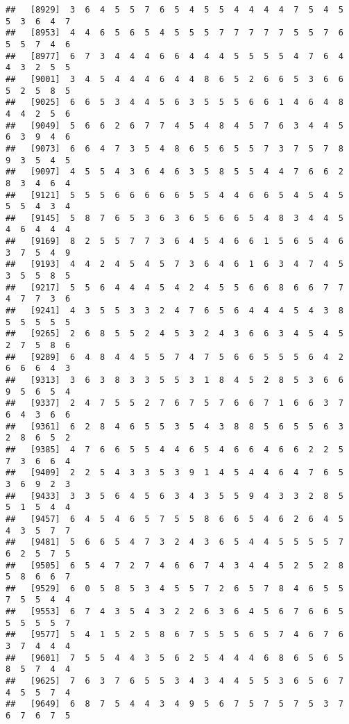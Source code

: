 \documentclass[
]{book}
\begin{document}
\begin{verbatim}
##   [8929]  3  6  4  5  5  7  6  5  4  5  5  4  4  4  4  7  5  4  5  5  3  6  4  7
##   [8953]  4  4  6  5  6  5  4  5  5  5  7  7  7  7  7  5  5  7  6  5  5  7  4  6
##   [8977]  6  7  3  4  4  4  6  6  4  4  4  5  5  5  5  4  7  6  4  4  3  2  5  5
##   [9001]  3  4  5  4  4  4  6  4  4  8  6  5  2  6  6  5  3  6  6  5  2  5  8  5
##   [9025]  6  6  5  3  4  4  5  6  3  5  5  5  6  6  1  4  6  4  8  4  4  2  5  6
##   [9049]  5  6  6  2  6  7  7  4  5  4  8  4  5  7  6  3  4  4  5  6  3  9  4  6
##   [9073]  6  6  4  7  3  5  4  8  6  5  6  5  5  7  3  7  5  7  8  9  3  5  4  5
##   [9097]  4  5  5  4  3  6  4  6  3  5  8  5  5  4  4  7  6  6  2  8  3  4  6  4
##   [9121]  5  5  5  6  6  6  6  6  5  5  4  4  6  6  5  4  5  4  5  5  5  4  3  4
##   [9145]  5  8  7  6  5  3  6  3  6  5  6  6  5  4  8  3  4  4  5  4  6  4  4  4
##   [9169]  8  2  5  5  7  7  3  6  4  5  4  6  6  1  5  6  5  4  6  3  7  5  4  9
##   [9193]  4  4  2  4  5  4  5  7  3  6  4  6  1  6  3  4  7  4  5  3  5  5  8  5
##   [9217]  5  5  6  4  4  4  5  4  2  4  5  5  6  6  8  6  6  7  7  4  7  7  3  6
##   [9241]  4  3  5  5  3  3  2  4  7  6  5  6  4  4  4  5  4  3  8  5  5  5  5  5
##   [9265]  2  6  8  5  5  2  4  5  3  2  4  3  6  6  3  4  5  4  5  2  7  5  8  6
##   [9289]  6  4  8  4  4  5  5  7  4  7  5  6  6  5  5  5  6  4  2  6  6  6  4  3
##   [9313]  3  6  3  8  3  3  5  5  3  1  8  4  5  2  8  5  3  6  6  9  5  6  5  4
##   [9337]  2  4  7  5  5  2  7  6  7  5  7  6  6  7  1  6  6  3  7  6  4  3  6  6
##   [9361]  6  2  8  4  6  5  5  3  5  4  3  8  8  5  6  5  5  6  3  2  8  6  5  2
##   [9385]  4  7  6  6  5  5  4  4  6  5  4  6  6  4  6  6  2  2  5  7  3  6  6  4
##   [9409]  2  2  5  4  3  3  5  3  9  1  4  5  4  4  6  4  7  6  5  3  6  9  2  3
##   [9433]  3  3  5  6  4  5  6  3  4  3  5  5  9  4  3  3  2  8  5  5  1  5  4  4
##   [9457]  6  4  5  4  6  5  7  5  5  8  6  6  5  4  6  2  6  4  5  4  3  5  7  7
##   [9481]  5  6  6  5  4  7  3  2  4  3  6  5  4  4  5  5  5  5  7  6  2  5  7  5
##   [9505]  6  5  4  7  2  7  4  6  6  7  4  3  4  4  5  2  5  2  8  5  8  6  6  7
##   [9529]  6  0  5  8  5  3  4  5  5  7  2  6  5  7  8  4  6  5  5  7  5  5  4  4
##   [9553]  6  7  4  3  5  4  3  2  2  6  3  6  4  5  6  7  6  6  5  5  5  5  5  7
##   [9577]  5  4  1  5  2  5  8  6  7  5  5  5  6  5  7  4  6  7  6  3  7  4  4  4
##   [9601]  7  5  5  4  4  3  5  6  2  5  4  4  4  6  8  6  5  6  5  8  5  7  4  4
##   [9625]  7  6  3  7  6  5  5  3  4  3  4  4  5  5  3  6  5  6  7  4  5  5  7  4
##   [9649]  6  8  7  5  4  4  3  4  9  5  6  7  5  7  5  7  5  3  7  6  7  6  7  5

\end{verbatim}
\end{document}
